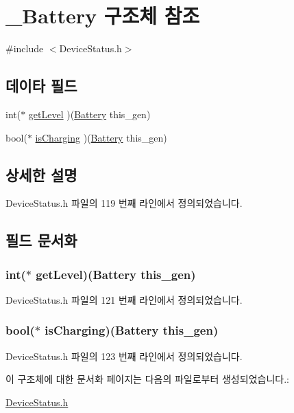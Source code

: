 \hypertarget{struct___battery}{\section{\-\_\-\-Battery 구조체 참조}
\label{struct___battery}
}


{\ttfamily \#include $<$Device\-Status.\-h$>$}

\subsection*{데이타 필드}
\begin{DoxyCompactItemize}
\item 
int($\ast$ \hyperlink{struct___battery_a6321988705fe01fbbd13ed44645920ce}{get\-Level} )(\hyperlink{namespace_3global_scope_4_struct_battery}{Battery} this\-\_\-gen)
\item 
bool($\ast$ \hyperlink{struct___battery_a58bd0a8a8a168cad5a323b2cef48f161}{is\-Charging} )(\hyperlink{namespace_3global_scope_4_struct_battery}{Battery} this\-\_\-gen)
\end{DoxyCompactItemize}


\subsection{상세한 설명}


Device\-Status.\-h 파일의 119 번째 라인에서 정의되었습니다.



\subsection{필드 문서화}
\hypertarget{struct___battery_a6321988705fe01fbbd13ed44645920ce}{
\subsubsection[{get\-Level}]{\setlength{\rightskip}{0pt plus 5cm}int($\ast$  get\-Level)({\bf Battery} this\-\_\-gen)}}\label{struct___battery_a6321988705fe01fbbd13ed44645920ce}


Device\-Status.\-h 파일의 121 번째 라인에서 정의되었습니다.

\hypertarget{struct___battery_a58bd0a8a8a168cad5a323b2cef48f161}{
\subsubsection[{is\-Charging}]{\setlength{\rightskip}{0pt plus 5cm}bool($\ast$  is\-Charging)({\bf Battery} this\-\_\-gen)}}\label{struct___battery_a58bd0a8a8a168cad5a323b2cef48f161}


Device\-Status.\-h 파일의 123 번째 라인에서 정의되었습니다.



이 구조체에 대한 문서화 페이지는 다음의 파일로부터 생성되었습니다.\-:\begin{DoxyCompactItemize}
\item 
\hyperlink{_device_status_8h}{Device\-Status.\-h}\end{DoxyCompactItemize}
